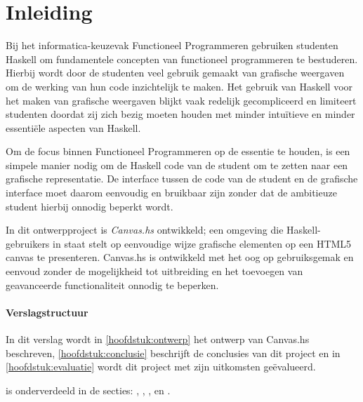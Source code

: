 \chapter{Inleiding}
Bij het informatica-keuzevak Functioneel Programmeren gebruiken studenten Haskell om fundamentele concepten van functioneel programmeren te bestuderen. Hierbij wordt door de studenten veel gebruik gemaakt van grafische weergaven om de werking van hun code inzichtelijk te maken. Het gebruik van Haskell voor het maken van grafische weergaven blijkt vaak redelijk gecompliceerd en limiteert studenten doordat zij zich bezig moeten houden met minder intuïtieve en minder essentiële aspecten van Haskell. 

Om de focus binnen Functioneel Programmeren op de essentie te houden, is een simpele manier nodig om de Haskell code van de student om te zetten naar een grafische representatie. De interface tussen de code van de student en de grafische interface moet daarom eenvoudig en bruikbaar zijn zonder dat de ambitieuze student hierbij onnodig beperkt wordt.

In dit ontwerpproject is \emph{Canvas.hs} ontwikkeld; een omgeving die Haskell-gebruikers in staat stelt op eenvoudige wijze grafische elementen op een HTML5 canvas te presenteren. Canvas.hs is ontwikkeld met het oog op gebruiksgemak en eenvoud zonder de mogelijkheid tot uitbreiding en het toevoegen van geavanceerde functionaliteit onnodig te beperken.

\subsubsection{Verslagstructuur}
In dit verslag wordt in \autoref{hoofdstuk:ontwerp} het ontwerp van Canvas.hs beschreven, \autoref{hoofdstuk:conclusie} beschrijft de conclusies van dit project en in \autoref{hoofdstuk:evaluatie} wordt dit project met zijn uitkomsten geëvalueerd.

 is onderverdeeld in de secties: , , ,  en .
